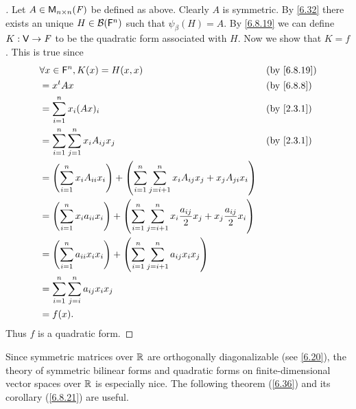 \begin{proof}[]
  Let \(A \in \ms[n][n][\F]\) be defined as above.
  Clearly \(A\) is symmetric.
  By \cref{6.32} there exists an unique \(H \in \mathcal{B}(\mathsf{F}^n)\) such that \(\psi_{\beta}(H) = A\).
  By \cref{6.8.19} we can define \(K : \mathsf{V} \to \mathit{F}\) to be the quadratic form associated with \(H\).
  Now we show that \(K = f\).
  This is true since
  \begin{align*}
     & \forall x \in \vs{F}^n, K(x) = H(x, x)                                                                                                 &  & \by{6.8.19} \\
     & = \tp{x} A x                                                                                                                           &  & \by{6.8.8}  \\
     & = \sum_{i = 1}^n x_i (Ax)_{i}                                                                                                          &  & \by{2.3.1}  \\
     & = \sum_{i = 1}^n \sum_{j = 1}^n x_i A_{i j} x_j                                                                                        &  & \by{2.3.1}  \\
     & = \pa{\sum_{i = 1}^n x_i A_{i i} x_i} + \pa{\sum_{i = 1}^n \sum_{j = i + 1}^n x_i A_{i j} x_j + x_j A_{j i} x_i}                                        \\
     & = \pa{\sum_{i = 1}^n x_i a_{i i} x_i} + \pa{\sum_{i = 1}^n \sum_{j = i + 1}^n x_i \dfrac{a_{i j}}{2} x_j + x_j \dfrac{a_{i j}}{2} x_i}                  \\
     & = \pa{\sum_{i = 1}^n a_{i i} x_i x_i} + \pa{\sum_{i = 1}^n \sum_{j = i + 1}^n a_{i j} x_i x_j}                                                          \\
     & = \sum_{i = 1}^n \sum_{j = i}^n a_{i j} x_i x_j                                                                                                         \\
     & = f(x).
  \end{align*}
  Thus \(f\) is a quadratic form.
\end{proof}

\begin{note}
  Since symmetric matrices over \(\mathbb{R}\) are orthogonally diagonalizable (see \cref{6.20}), the theory of symmetric bilinear forms and quadratic forms on finite-dimensional vector spaces over \(\mathbb{R}\) is especially nice.
  The following theorem (\cref{6.36}) and its corollary (\cref{6.8.21}) are useful.
\end{note}

